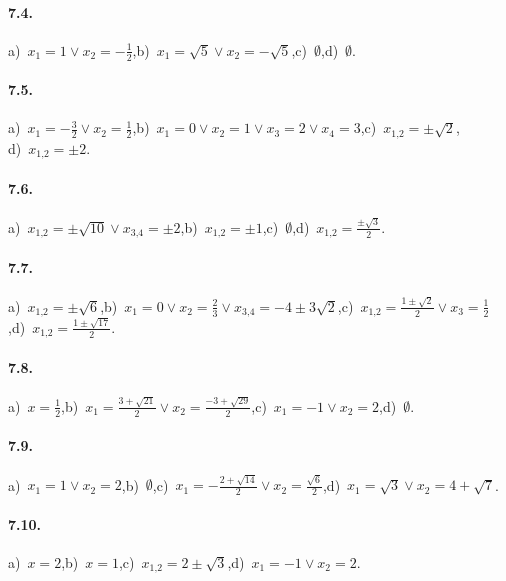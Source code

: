 \paragraph{7.4.} a)~$x_1=1\vee x_2=-\frac 1 2$,\quad b)~$x_1=\sqrt 5\vee x_2=-\sqrt 5$,\quad c)~$\emptyset $,\quad d)~$\emptyset $.

\paragraph{7.5.} a)~$x_1=-\frac 3 2\vee x_2=\frac 1 2$,\quad b)~$x_1=0\vee x_2=1\vee x_3=2\vee x_4=3$,\quad c)~$x_{1\text{,}2}=\pm \sqrt 2$,\protect\\
\quad d)~$x_{1\text{,}2}=\pm 2$.

\paragraph{7.6.} a)~$x_{1\text{,}2}=\pm \sqrt{10}\vee x_{3\text{,}4}=\pm 2$,\quad b)~$x_{1\text{,}2}=\pm 1$,\quad c)~$\emptyset $,\quad d)~$x_{1\text{,}2}=\frac{\pm \sqrt 3} 2$.

\paragraph{7.7.} a)~$x_{1\text{,}2}=\pm \sqrt 6$,\quad b)~$x_1=0\vee x_2=\frac 2 3\vee x_{3\text{,}4}=-4\pm 3\sqrt 2$,\quad c)~$x_{1\text{,}2}=\frac{1\pm \sqrt 2} 2\vee x_3=\frac 1 2$,\quad d)~$x_{1\text{,}2}=\frac{1\pm \sqrt{17}} 2$.

\paragraph{7.8.} a)~$x=\frac 1 2$,\quad b)~$x_1=\frac{3+\sqrt{21}} 2\vee x_2=\frac{-3+\sqrt{29}} 2$,\quad c)~$x_1=-1\vee x_2=2$,\quad d)~$\emptyset $.

\paragraph{7.9.} a)~$x_1=1\vee x_2=2$,\quad b)~$\emptyset $,\quad c)~$x_1=-\frac{2+\sqrt{14}} 2\vee x_2=\frac{\sqrt 6} 2$,\quad d)~$x_1=\sqrt 3\vee x_2=4+\sqrt 7$.

\paragraph{7.10.} a)~$x=2$,\quad b)~$x=1$,\quad c)~$x_{1\text{,}2}=2\pm \sqrt 3$,\quad d)~$x_1=-1\vee x_2=2$.

